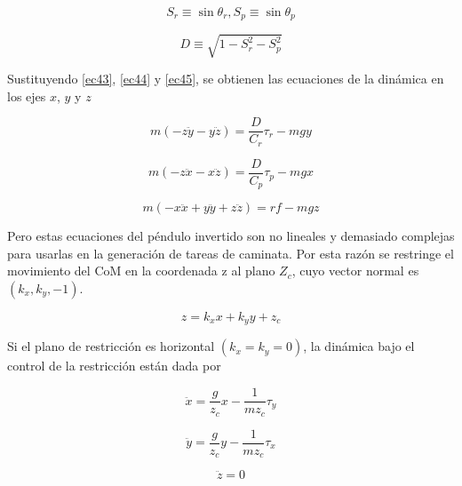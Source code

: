 \begin{equation}
S_r \equiv \sin\theta_r, S_p \equiv \sin\theta_p
\label{ec49}
\end{equation}

\begin{equation}
D \equiv \sqrt{1-S_r^{2}-S_p^{2}}
\label{ec410}
\end{equation}

Sustituyendo \ref{ec43}, \ref{ec44} y \ref{ec45}, se obtienen las ecuaciones de la dinámica en los ejes $x$, $y$ y $z$

\begin{equation}
m\left ( -z\ddot{y} - y\ddot{z} \right ) = \frac{D}{C_r}\tau_r - mgy
\label{ec411} 
\end{equation}

\begin{equation}
m\left ( -z\ddot{x} - x\ddot{z} \right ) = \frac{D}{C_p}\tau_p - mgx
\label{ec412} 
\end{equation}

\begin{equation}
m\left ( -x\ddot{x} + y\ddot{y} + z\ddot{z} \right ) = rf - mgz
\label{ec413} 
\end{equation}

Pero estas ecuaciones del péndulo invertido son no lineales y demasiado complejas para usarlas en la generación de tareas de caminata. Por esta razón se restringe el movimiento del CoM en la coordenada z al plano $Z_c$, cuyo vector normal es $(k_x,k_y,-1)$.

\begin{equation}
z = k_x x + k_y y + z_c
\label{ec414}
\end{equation}


Si el plano de restricción es horizontal $(k_x=k_y=0)$, la dinámica bajo el control de la restricción están dada por

\begin{equation}
\ddot{x}=\frac{g}{z_c}x - \frac{1}{m z_c}\tau_y
\label{ec415}
\end{equation}

\begin{equation}
\ddot{y}=\frac{g}{z_c}y - \frac{1}{m z_c}\tau_x
\label{ec416}
\end{equation}

\begin{equation}
\ddot{z}=0
\label{ec417}
\end{equation}

